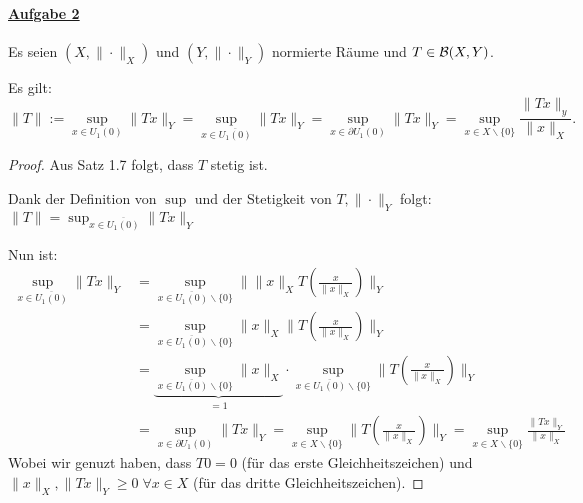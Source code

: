 \paragraph{\underline{Aufgabe 2}}
Es seien $(X,\|\cdot\|_X)$ und $(Y,\|\cdot\|_Y)$ normierte Räume und $T\in \mathcal{B}(X,Y)$.
\begin{beh}
	Es gilt:
	$$\|T\|:=\sup_{x\in U_1(0)} \|Tx\|_Y = \sup_{x\in\overline{U_1(0)}}\|Tx\|_Y = \sup_{x\in \partial U_1(0)} \|Tx\|_Y = \sup_{x\in X\backslash \{0\}} \frac{\|Tx\|_y}{\|x\|_X}.$$
\end{beh}
\begin{proof}
	Aus Satz 1.7 folgt, dass $T$ stetig ist. \par 
	Dank der Definition von $\sup$ und der Stetigkeit von $T,\|\cdot \|_Y$ folgt: $\displaystyle \|T\|=\sup_{x\in\overline{U_1(0)}}\|Tx\|_Y$ \par 
	Nun ist: 
	\begin{equation*}
\begin{split}
\sup_{x\in\overline{U_1(0)}}\|Tx\|_Y & = \sup_{x\in\overline{U_1(0)}\backslash\{0\}}\|\|x\|_X T\left(\frac{x}{\|x\|_X}\right)\|_Y
\\ & = \sup_{x\in\overline{U_1(0)}\backslash\{0\}}\|x\|_X \|T\left(\frac{x}{\|x\|_X}\right)\|_Y
\\ & = \underbrace{\sup_{x\in\overline{U_1(0)}\backslash\{0\}}\|x\|_X}_{=1}
	   \cdot \sup_{x\in\overline{U_1(0)}\backslash\{0\}} \|T\left(\frac{x}{\|x\|_X}\right)\|_Y
\\ & = \sup_{x\in \partial U_1(0)} \|Tx\|_Y  =
	\sup_{x\in X\backslash\{0\}} \|T\left(\frac{x}{\|x\|_X}\right)\|_Y
 = \sup_{x\in X\backslash\{0\}} \frac{\|Tx\|_Y}{\|x\|_X}
\end{split}
\end{equation*}
Wobei wir genuzt haben, dass $T0 = 0$ (für das erste Gleichheitszeichen) und $\|x\|_X,\|Tx\|_Y\geq 0\;\forall x\in X$ (für das dritte Gleichheitszeichen). 
\end{proof}

